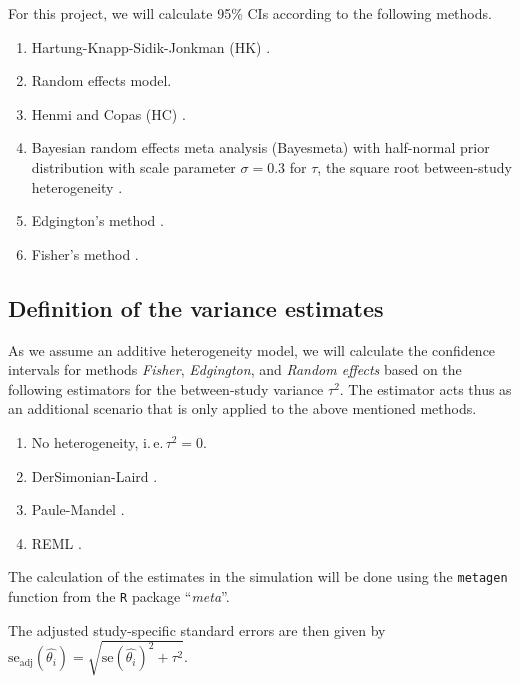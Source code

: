 \documentclass[letterpaper, 12pt]{article}
\newcommand{\ie}{{i.\,e.\,}}
\begin{document}
For this project, we will calculate 95\% CIs according to the following methods.

\begin{enumerate}
  \item Hartung-Knapp-Sidik-Jonkman (HK) \citep{IntHoutIoannidis}.
  \item Random effects model.
  \item Henmi and Copas (HC) \citep{henm:copa:10}.
  \item Bayesian random effects meta analysis (Bayesmeta) with half-normal prior
    distribution with scale parameter $\sigma = 0.3$ for $\tau$, the square root
    between-study heterogeneity  \citep{rov:20, lil:2023}.
  \item Edgington's method \citep{edgington:72}.
  \item Fisher's method \citep{fisher:34}.
\end{enumerate}

\subsection{Definition of the variance estimates} \label{sec:varadj}

As we assume an additive heterogeneity model, we will calculate the confidence
intervals for methods \emph{Fisher}, \emph{Edgington}, and \emph{Random effects}
based on the following estimators for the between-study variance $\tau^2$. The
estimator acts thus as an additional scenario that is only applied to the above
mentioned methods.

\begin{enumerate}
  \item No heterogeneity, \ie $\tau^2 = 0$.
  \item DerSimonian-Laird \citep{ders:lair:86}.
  \item Paule-Mandel \citep{paul:man:82}.
  \item REML \citep{harv:77}.
\end{enumerate}

The calculation of the estimates in the simulation will be done using the
\texttt{metagen} function from the \texttt{R} package ``\emph{meta}''.

The adjusted study-specific standard errors are then given by
$\text{se}_{\text{adj}}(\hat{\theta_i}) = \sqrt{\text{se}(\hat{\theta_i})^2 + \tau^2}$.

\end{document}
